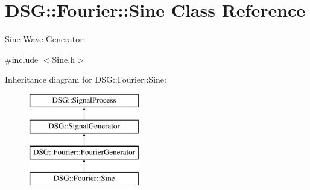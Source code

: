 \hypertarget{classDSG_1_1Fourier_1_1Sine}{\section{D\-S\-G\-:\-:Fourier\-:\-:Sine Class Reference}
\label{classDSG_1_1Fourier_1_1Sine}
}


\hyperlink{classDSG_1_1Fourier_1_1Sine}{Sine} Wave Generator.  




{\ttfamily \#include $<$Sine.\-h$>$}

Inheritance diagram for D\-S\-G\-:\-:Fourier\-:\-:Sine\-:\begin{figure}[H]
\begin{center}
\leavevmode
\includegraphics[height=4.000000cm]{classDSG_1_1Fourier_1_1Sine}
\end{center}
\end{figure}
